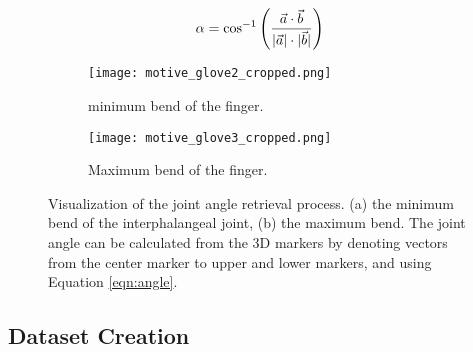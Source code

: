 \documentclass[../main.tex]{subfiles}
\begin{document}
\begin{equation}
\label{eqn:angle}
\alpha = \cos^{-1}\left({\frac{\vec{a} \cdot \vec{b}}{ \lvert \vec{a} \rvert \cdot \lvert \vec{b} \rvert }}\right)
\end{equation}


\begin{figure}[H]
    \begin{subfigure}[b]{0.49\textwidth}
        \centering
        \texttt{[image: motive\_glove2\_cropped.png]}
        \caption{minimum bend of the finger.}
        \label{fig:minbend}
    \end{subfigure}
    \hfill
    \begin{subfigure}[b]{0.49\textwidth}
        \centering
        \texttt{[image: motive\_glove3\_cropped.png]}
        \caption{Maximum bend of the finger.}
        \label{fig:maxbend}
    \end{subfigure}
    \caption{Visualization of the joint angle retrieval process. (a) the minimum bend of the \gls{interphalangeal joint}, (b) the maximum bend. The joint angle can be calculated from the 3D markers by denoting vectors from the center marker to upper and lower markers, and using Equation \eqref{eqn:angle}.}

\end{figure}

\subsection{Dataset Creation}
\label{sec:dataset}
\end{document}
